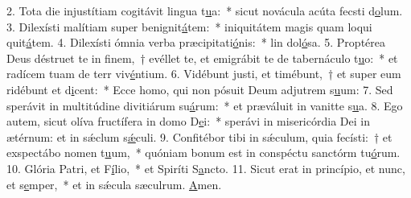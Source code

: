 2. Tota die injustítiam cogitávit lingua t\uline{u}a:~* sicut novácula acúta fecsti d\uline{o}lum.
3. Dilexísti malítiam super benignit\uline{á}tem:~* iniquitátem magis quam loqui quit\uline{á}tem.
4. Dilexísti ómnia verba præcipitati\uline{ó}nis:~* lin dol\uline{ó}sa.
5. Proptérea Deus déstruet te in finem,~† evéllet te, et emigrábit te de tabernáculo t\uline{u}o:~* et radícem tuam de terr viv\uline{é}ntium.
6. Vidébunt justi, et timébunt,~† et super eum ridébunt et d\uline{i}cent:~* Ecce homo, qui non pósuit Deum adjutrem s\uline{u}um:
7. Sed sperávit in multitúdine divitiárum su\uline{á}rum:~* et præváluit in vanitte s\uline{u}a.
8. Ego autem, sicut olíva fructífera in domo D\uline{e}i:~* sperávi in misericórdia Dei in ætérnum: et in sǽclum s\uline{ǽ}culi.
9. Confitébor tibi in sǽculum, quia fecísti:~† et exspectábo nomen t\uline{u}um,~* quóniam bonum est in conspéctu sanctórm tu\uline{ó}rum.
10. Glória Patri, et F\uline{í}lio,~* et Spiríti S\uline{a}ncto.
11. Sicut erat in princípio, et nunc, et s\uline{e}mper,~* et in sǽcula sæculrum. \uline{A}men.
